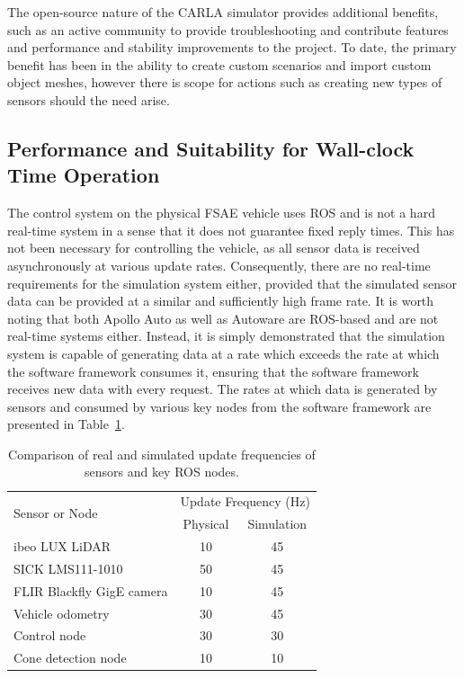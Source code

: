 The open-source nature of the CARLA simulator provides additional benefits, such as an active community to provide troubleshooting and contribute features and performance and stability improvements to the project.
To date, the primary benefit has been in the ability to create custom scenarios and import custom object meshes, however there is scope for actions such as creating new types of sensors should the need arise.

\subsection{Performance and Suitability for Wall-clock Time Operation} \label{subsec:8:performanceAndSuitabilityForWallClockTimeOperation}

The control system on the physical FSAE vehicle uses ROS and is not a hard real-time system in a sense that it does not guarantee fixed reply times.
This has not been necessary for controlling the vehicle, as all sensor data is received asynchronously at various update rates.
Consequently, there are no real-time requirements for the simulation system either, provided that the simulated sensor data can be provided at a similar and sufficiently high frame rate.
It is worth noting that both Apollo Auto as well as Autoware are ROS-based and are not real-time systems either.
Instead, it is simply demonstrated that the simulation system is capable of generating data at a rate which exceeds the rate at which the software framework consumes it, ensuring that the software framework receives new data with every request.
The rates at which data is generated by sensors and consumed by various key nodes from the software framework are presented in Table~\ref{tbl:8:nodeUpdateFrequencies}.

\begin{table}[H]
	\centering
	\caption[Real and simulated update frequencies of sensors and ROS nodes]{Comparison of real and simulated update frequencies of sensors and key ROS nodes.}
	\label{tbl:8:nodeUpdateFrequencies}
	\begin{tabular}{lcc}
		\toprule
		\multirow{2}{*}{Sensor or Node} & \multicolumn{2}{l}{Update Frequency (Hz)} \\
		\cmidrule(l){2-3}               & Physical &           Simulation           \\ \midrule
		ibeo LUX LiDAR                  &    10    &               45               \\
		SICK LMS111-1010                &    50    &               45               \\
		FLIR Blackfly GigE camera       &    10    &               45               \\
		Vehicle odometry                &    30    &               45               \\
		Control node                    &    30    &               30               \\
		Cone detection node             &    10    &               10               \\ \bottomrule
	\end{tabular}
\end{table}

